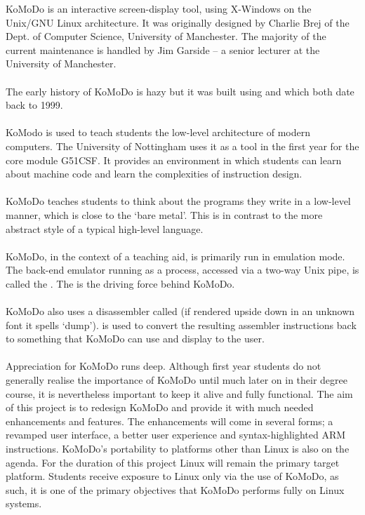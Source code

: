 KoMoDo is an interactive screen-display tool, using X-Windows on the Unix/GNU Linux architecture. It was originally designed by Charlie Brej of the Dept. of Computer Science, University of Manchester. The majority of the current maintenance is handled by Jim Garside -- a senior lecturer at the University of Manchester.\\\\
%
The early history of KoMoDo is hazy but it was built using  and  which both date back to 1999.\\\\
%
KoModo is used to teach students the low-level architecture of modern computers. The University of Nottingham uses it as a tool in the first year for the core module G51CSF. It provides an environment in which students can learn about machine code and learn the complexities of instruction design.\\\\
%
KoMoDo teaches students to think about the programs they write in a low-level manner, which is close to the `bare metal'. This is in contrast to the more abstract style of a typical high-level language.\\\\
%
KoMoDo, in the context of a teaching aid, is primarily run in emulation mode. The back-end emulator running as a process, accessed via a two-way Unix pipe, is called the . The  is the driving force behind KoMoDo.\\\\
%
KoMoDo also uses a disassembler called  (if rendered upside down in an unknown font it spells `dump').  is used to convert the resulting assembler instructions back to something that KoMoDo can use and display to the user.\\\\
%
Appreciation for KoMoDo runs deep. Although first year students do not generally realise the importance of KoMoDo until much later on in their degree course, it is nevertheless  important to keep it alive and fully functional.
%
The aim of this project is to redesign KoMoDo and provide it with much needed enhancements and features. The enhancements will come in several forms; a revamped user interface, a better user experience and syntax-highlighted ARM instructions. KoMoDo's portability to platforms other than Linux is also on the agenda. For the duration of this project Linux will remain the primary target platform. Students receive exposure to Linux only via the use of KoMoDo, as such, it is one of the primary objectives that KoMoDo performs fully on Linux systems.

